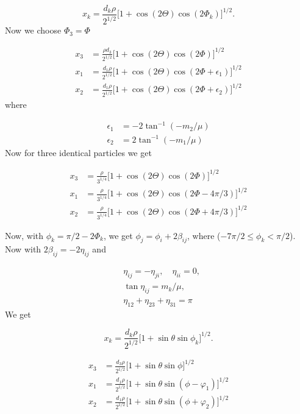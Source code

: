 \documentclass{article}
\numberwithin{equation}{section}
\numberwithin{figure}{section}
\begin{document}
\begin{equation}
x_k = \frac{d_k\rho}{2^{1/2}}\big[1 + \cos(2\Theta)\cos(2\Phi_k)\big]^{1/2}.
\end{equation}
Now we choose $\Phi_3=\Phi$

\begin{align}
x_3 &= \frac{\rho d_3}{2^{1/2}}\big[1+\cos(2\Theta)\cos(2\Phi)\big]^{1/2}\\
x_1 &= \frac{d_1\rho}{2^{1/2}}\big[1 + \cos(2\Theta)\cos(2\Phi + \epsilon_1)\big]^{1/2}\\
x_2 &= \frac{d_1\rho}{2^{1/2}}\big[1 + \cos(2\Theta)\cos(2\Phi + \epsilon_2)\big]^{1/2}
\end{align}
where

\begin{align}
\epsilon_1 &= -2\tan^{-1}(-m_2/\mu)\\
\epsilon_2 &= 2\tan^{-1}(-m_1/\mu)
\end{align}
Now for three identical particles we get

\begin{align}
x_3 &= \frac{\rho}{3^{1/4}}\big[1+\cos(2\Theta)\cos(2\Phi)\big]^{1/2}\\
x_1 &= \frac{\rho}{3^{1/4}}\big[1 + \cos(2\Theta)\cos(2\Phi - 4\pi/3)\big]^{1/2}\\
x_2 &= \frac{\rho}{3^{1/4}}\big[1 + \cos(2\Theta)\cos(2\Phi + 4\pi/3)\big]^{1/2}
\end{align}

Now, with $\phi_k = \pi/2-2\Phi_k$, we get $\phi_j=\phi_i+2\beta_{ij}$, where ($-7\pi/2 \leq \phi_k < \pi/2$). Now with $2\beta_{ij} = -2\eta_{ij}$ and

\begin{align}
&\eta_{ij} = -\eta_{ji}, \quad \eta_{ii} = 0,\\
&\tan\eta_{ij} = m_k/\mu,\\
&\eta_{12}+\eta_{23}+\eta_{31} = \pi
\end{align} 
We get

\begin{equation}
x_k = \frac{d_k\rho}{2^{1/2}}\big[1 + \sin\theta\sin\phi_k\big]^{1/2}.
\end{equation}

\begin{align}
x_3 &= \frac{d_3\rho}{2^{1/2}}\big[1+\sin\theta\sin\phi\big]^{1/2}\\
x_1 &= \frac{d_1\rho}{2^{1/2}}\big[1 + \sin\theta\sin(\phi-\varphi_1)\big]^{1/2}\\
x_2 &= \frac{d_1\rho}{2^{1/2}}\big[1 + \sin\theta\sin(\phi + \varphi_2)\big]^{1/2}
\end{align}
\end{document}
